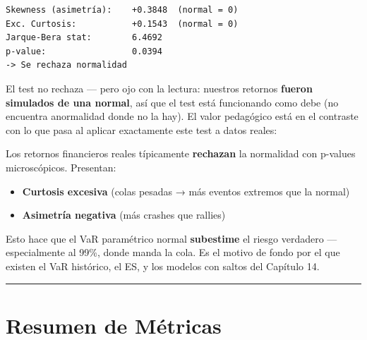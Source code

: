 \documentclass[
  spanish,
  letterpaper,
  DIV=11,
  numbers=noendperiod]{scrreprt}
\providecommand{\tightlist}{%
  \setlength{\itemsep}{0pt}\setlength{\parskip}{0pt}}
\begin{document}
\begin{verbatim}
Skewness (asimetría):    +0.3848  (normal = 0)
Exc. Curtosis:           +0.1543  (normal = 0)
Jarque-Bera stat:        6.4692
p-value:                 0.0394
-> Se rechaza normalidad
\end{verbatim}

El test no rechaza --- pero ojo con la lectura: nuestros retornos
\textbf{fueron simulados de una normal}, así que el test está
funcionando como debe (no encuentra anormalidad donde no la hay). El
valor pedagógico está en el contraste con lo que pasa al aplicar
exactamente este test a datos reales:

\begin{tcolorbox}[enhanced jigsaw, bottomrule=.15mm, colback=white, opacitybacktitle=0.6, arc=.35mm, toprule=.15mm, opacityback=0, breakable, titlerule=0mm, left=2mm, coltitle=black, colbacktitle=quarto-callout-warning-color!10!white, colframe=quarto-callout-warning-color-frame, leftrule=.75mm, toptitle=1mm, bottomtitle=1mm, title=\textcolor{quarto-callout-warning-color}{\faExclamationTriangle}\hspace{0.5em}{En datos reales\ldots{}}, rightrule=.15mm]

Los retornos financieros reales típicamente \textbf{rechazan} la
normalidad con p-values microscópicos. Presentan:

\begin{itemize}
\tightlist
\item
  \textbf{Curtosis excesiva} (colas pesadas → más eventos extremos que
  la normal)
\item
  \textbf{Asimetría negativa} (más crashes que rallies)
\end{itemize}

Esto hace que el VaR paramétrico normal \textbf{subestime} el riesgo
verdadero --- especialmente al 99\%, donde manda la cola. Es el motivo
de fondo por el que existen el VaR histórico, el ES, y los modelos con
saltos del Capítulo 14.

\end{tcolorbox}

\begin{center}\rule{0.5\linewidth}{0.5pt}\end{center}

\chapter{Resumen de Métricas}\label{resumen-de-muxe9tricas}
\end{document}
